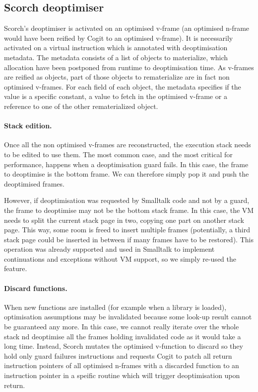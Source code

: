 \documentclass[a4paper,12pt,twoside]{../includes/ThesisStyle}
\begin{document}

\subsection{Scorch deoptimiser}

Scorch's deoptimiser is activated on an optimised v-frame (an optimised n-frame would have been reified by Cogit to an optimised v-frame). It is necessarily activated on a virtual instruction which is annotated with deoptimisation metadata. The metadata consists of a list of objects to materialize, which allocation have been postponed from runtime to deoptimisation time. As v-frames are reified as objects, part of those objects to rematerialize are in fact non optimised v-frames. For each field of each object, the metadata specifies if the value is a specific constant, a value to fetch in the optimised v-frame or a reference to one of the other rematerialized object.

\paragraph{Stack edition.}


Once all the non optimised v-frames are reconstructed, the execution stack needs to be edited to use them. The most common case, and the most critical for performance, happens when a deoptimisation guard fails. In this case, the frame to deoptimise is the bottom frame. We can therefore simply pop it and push the deoptimised frames.

However, if deoptimisation was requested by Smalltalk code and not by a guard, the frame to deoptimise may not be the bottom stack frame. In this case, the VM needs to split the current stack page in two, copying one part on another stack page. This way, some room is freed to insert multiple frames (potentially, a third stack page could be inserted in between if many frames have to be restored). This operation was already supported and used in Smalltalk to implement continuations and exceptions without VM support, so we simply re-used the feature.

\paragraph{Discard functions.} When new functions are installed (for example when a library is loaded), optimisation assumptions may be invalidated because some look-up result cannot be guaranteed any more. In this case, we cannot really iterate over the whole stack nd deoptimise all the frames holding invalidated code as it would take a long time. Instead, Scorch mutates the optimised v-function to discard so they hold only guard failures instructions and requests Cogit to patch all return instruction pointers of all optimised n-frames with a discarded function to an instruction pointer in a speific routine which will trigger deoptimisation upon return.
\end{document}
